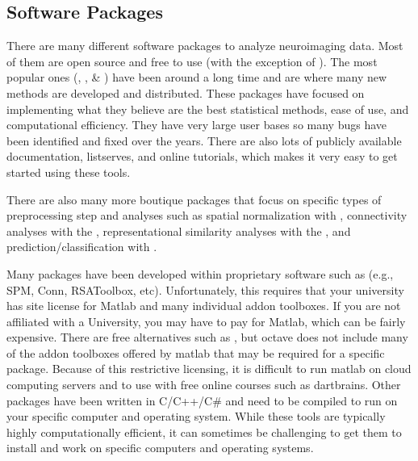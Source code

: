 \documentclass[letterpaper,10pt,english]{sphinxmanual}
\begin{document}
\noindent{}


\subsection{Software Packages}
\label{\detokenize{content/Introduction_to_Neuroimaging_Data:software-packages}}
There are many different software packages to analyze neuroimaging data. Most of them are open source and free to use (with the exception of ). The most popular ones (, , \& ) have been around a long time and are where many new methods are developed and distributed. These packages have focused on implementing what they believe are the best statistical methods, ease of use, and computational efficiency. They have very large user bases so many bugs have been identified and fixed over the years. There are also lots of publicly available documentation, listserves, and online tutorials, which makes it very easy to get started using these tools.

There are also many more boutique packages that focus on specific types of preprocessing step and analyses such as spatial normalization with , connectivity analyses with the , representational similarity analyses with the , and prediction/classification with .

Many packages have been developed within proprietary software such as  (e.g., SPM, Conn, RSAToolbox, etc). Unfortunately, this requires that your university has site license for Matlab and many individual add\sphinxhyphen{}on toolboxes. If you are not affiliated with a University, you may have to pay for Matlab, which can be fairly expensive. There are free alternatives such as , but octave does not include many of the add\sphinxhyphen{}on toolboxes offered by matlab that may be required for a specific package. Because of this restrictive licensing, it is difficult to run matlab on cloud computing servers and to use with free online courses such as dartbrains. Other packages have been written in C/C++/C\# and need to be compiled to run on your specific computer and operating system. While these tools are typically highly computationally efficient, it can sometimes be challenging to get them to install and work on specific computers and operating systems.
\end{document}
